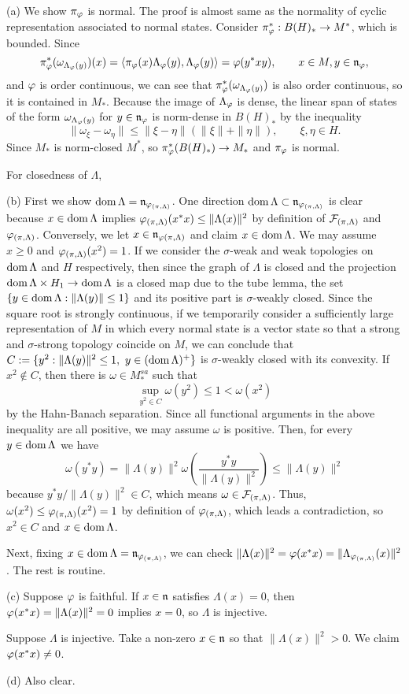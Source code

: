 \documentclass{../../small}
\begin{document}
\begin{pf}
(a)
We show $\pi_\varphi$ is normal.
The proof is almost same as the normality of cyclic representation associated to normal states.
Consider $\pi_\varphi^*:B(H)_*\to M^*$, which is bounded.
Since
\[\pi_\varphi^*(\omega_{\Lambda_\varphi(y)})(x)=\langle\pi_\varphi(x)\Lambda_\varphi(y),\Lambda_\varphi(y)\rangle=\varphi(y^*xy),\qquad x\in M, y\in\mathfrak{n}_\varphi,\]
and $\varphi$ is order continuous, we can see that $\pi_\varphi^*(\omega_{\Lambda_\varphi(y)})$ is also order continuous, so it is contained in $M_*$.
Because the image of $\Lambda_\varphi$ is dense, the linear span of states of the form $\omega_{\Lambda_\varphi(y)}$ for $y\in\mathfrak{n}_\varphi$ is norm-dense in $B(H)_*$ by the inequality
\[\|\omega_\xi-\omega_\eta\|\le\|\xi-\eta\|(\|\xi\|+\|\eta\|),\qquad\xi,\eta\in H.\]
Since $M_*$ is norm-closed $M^*$, so $\pi_\varphi^*(B(H)_*)\to M_*$ and $\pi_\varphi$ is normal.

For closedness of $\Lambda$,



(b)
First we show $\operatorname{dom}\Lambda=\mathfrak{n}_{\varphi_{(\pi,\Lambda)}}$.
One direction $\operatorname{dom}\Lambda\subset\mathfrak{n}_{\varphi_{(\pi,\Lambda)}}$ is clear because $x\in\operatorname{dom}\Lambda$ implies $\varphi_{(\pi,\Lambda)}(x^*x)\le\|\Lambda(x)\|^2$ by definition of $\mathcal{F}_{(\pi,\Lambda)}$ and $\varphi_{(\pi,\Lambda)}$.
Conversely, we let $x\in\mathfrak{n}_{\varphi(\pi,\Lambda)}$ and claim $x\in\operatorname{dom}\Lambda$.
We may assume $x\ge0$ and $\varphi_{(\pi,\Lambda)}(x^2)=1$.
If we consider the $\sigma$-weak and weak topologies on $\operatorname{dom}\Lambda$ and $H$ respectively, then since the graph of $\Lambda$ is closed and the projection $\operatorname{dom}\Lambda\times H_1\to\operatorname{dom}\Lambda$ is a closed map due to the tube lemma, the set $\{y\in\operatorname{dom}\Lambda:\|\Lambda(y)\|\le1\}$ and its positive part is $\sigma$-weakly closed.
Since the square root is strongly continuous, if we temporarily consider a sufficiently large representation of $M$ in which every normal state is a vector state so that a strong and $\sigma$-strong topology coincide on $M$, we can conclude that $C:=\{y^2:\|\Lambda(y)\|^2\le1,\ y\in(\dom\Lambda)^+\}$ is $\sigma$-weakly closed with its convexity.
If $x^2\notin C$, then there is $\omega\in M_*^{sa}$ such that
\[\sup_{y^2\in C}\omega(y^2)\le1<\omega(x^2)\]
by the Hahn-Banach separation.
Since all functional arguments in the above inequality are all positive, we may assume $\omega$ is positive.
Then, for every $y\in\operatorname{dom}\Lambda$ we have
\[\omega(y^*y)=\|\Lambda(y)\|^2\omega(\frac{y^*y}{\|\Lambda(y)\|^2})\le\|\Lambda(y)\|^2\]
because $y^*y/\|\Lambda(y)\|^2\in C$, which means $\omega\in\mathcal{F}_{(\pi,\Lambda)}$.
Thus, $\omega(x^2)\le\varphi_{(\pi,\Lambda)}(x^2)=1$ by definition of $\varphi_{(\pi,\Lambda)}$, which leads a contradiction, so $x^2\in C$ and $x\in\operatorname{dom}\Lambda$.


Next, fixing $x\in\operatorname{dom}\Lambda=\mathfrak{n}_{\varphi_{(\pi,\Lambda)}}$, we can check $\|\Lambda(x)\|^2=\varphi(x^*x)=\|\Lambda_{\varphi_{(\pi,\Lambda)}}(x)\|^2$.
The rest is routine.

(c)
Suppose $\varphi$ is faithful.
If $x\in\mathfrak{n}$ satisfies $\Lambda(x)=0$, then $\varphi(x^*x)=\|\Lambda(x)\|^2=0$ implies $x=0$, so $\Lambda$ is injective.

Suppose $\Lambda$ is injective.
Take a non-zero $x\in\mathfrak{n}$ so that $\|\Lambda(x)\|^2>0$.
We claim $\varphi(x^*x)\ne0$.

(d)
Also clear.
\end{pf}
\end{document}
